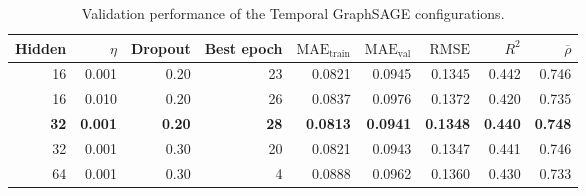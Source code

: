 \begin{table}[!htbp]
\centering
\footnotesize
\setlength{\tabcolsep}{2.5pt}
\caption{Validation performance of the Temporal GraphSAGE configurations.}
\label{tab:temporal-graphsage-tuning-comparison}
\begin{tabular}{rrrrrrrrr}
\toprule
Hidden & $\eta$ & Dropout & Best epoch & $\mathrm{MAE}_{\mathrm{train}}$ & $\mathrm{MAE}_{\mathrm{val}}$ & $\mathrm{RMSE}$ & $R^2$ & $\overline{\rho}$ \\
\midrule
16 & 0.001 & 0.20 & 23 & 0.0821 & 0.0945 & 0.1345 & 0.442 & 0.746 \\
16 & 0.010 & 0.20 & 26 & 0.0837 & 0.0976 & 0.1372 & 0.420 & 0.735 \\
\textbf{32} & \textbf{0.001} & \textbf{0.20} & \textbf{28} & \textbf{0.0813} & \textbf{0.0941} & \textbf{0.1348} & \textbf{0.440} & \textbf{0.748} \\
32 & 0.001 & 0.30 & 20 & 0.0821 & 0.0943 & 0.1347 & 0.441 & 0.746 \\
64 & 0.001 & 0.30 & 4 & 0.0888 & 0.0962 & 0.1360 & 0.430 & 0.733 \\
\bottomrule
\end{tabular}
\end{table}
